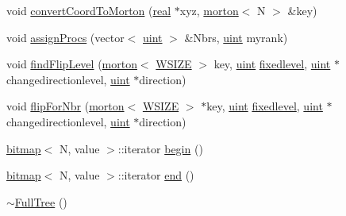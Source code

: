 \begin{DoxyCompactItemize}
\item 
void \mbox{\hyperlink{classFullTree_a1b0a9b6f0f5155dd8847905ee8aa1b56}{convert\+Coord\+To\+Morton}} (\mbox{\hyperlink{definitions_8h_aedc0ad84d1e764530814f57ad931d02a}{real}} $\ast$xyz, \mbox{\hyperlink{definitions_8h_af8682350bd8bb38ee9023f7a0a310add}{morton}}$<$ N $>$ \&key)
\item 
void \mbox{\hyperlink{classFullTree_a71034640d78c83c761cc005a77f83afa}{assign\+Procs}} (vector$<$ \mbox{\hyperlink{definitions_8h_a69aa29b598b851b0640aa225a9e5d61d}{uint}} $>$ \&Nbrs, \mbox{\hyperlink{definitions_8h_a69aa29b598b851b0640aa225a9e5d61d}{uint}} myrank)
\item 
void \mbox{\hyperlink{classFullTree_ae820d50b6b006f8bcdbcbcc5aa2fc9f6}{find\+Flip\+Level}} (\mbox{\hyperlink{definitions_8h_af8682350bd8bb38ee9023f7a0a310add}{morton}}$<$ \mbox{\hyperlink{params_8h_a869e77c8856c40dc7369197ee4ee8059ab8317ae7816b83628f4e2bcff586e2f5}{W\+S\+I\+ZE}} $>$ key, \mbox{\hyperlink{definitions_8h_a69aa29b598b851b0640aa225a9e5d61d}{uint}} \mbox{\hyperlink{classFullTree_a1bcc4d0daf8ad12569054422379b556f}{fixedlevel}}, \mbox{\hyperlink{definitions_8h_a69aa29b598b851b0640aa225a9e5d61d}{uint}} $\ast$changedirectionlevel, \mbox{\hyperlink{definitions_8h_a69aa29b598b851b0640aa225a9e5d61d}{uint}} $\ast$direction)
\item 
void \mbox{\hyperlink{classFullTree_ad3d930eda377be811df22070f6364865}{flip\+For\+Nbr}} (\mbox{\hyperlink{definitions_8h_af8682350bd8bb38ee9023f7a0a310add}{morton}}$<$ \mbox{\hyperlink{params_8h_a869e77c8856c40dc7369197ee4ee8059ab8317ae7816b83628f4e2bcff586e2f5}{W\+S\+I\+ZE}} $>$ $\ast$key, \mbox{\hyperlink{definitions_8h_a69aa29b598b851b0640aa225a9e5d61d}{uint}} \mbox{\hyperlink{classFullTree_a1bcc4d0daf8ad12569054422379b556f}{fixedlevel}}, \mbox{\hyperlink{definitions_8h_a69aa29b598b851b0640aa225a9e5d61d}{uint}} $\ast$changedirectionlevel, \mbox{\hyperlink{definitions_8h_a69aa29b598b851b0640aa225a9e5d61d}{uint}} $\ast$direction)
\item 
\mbox{\hyperlink{definitions_8h_acf2396ef4de9eb8a6324b9f1a624ea85}{bitmap}}$<$ N, value $>$\+::iterator \mbox{\hyperlink{classFullTree_af2fbecbd352a329634a6fdc35f519968}{begin}} ()
\item 
\mbox{\hyperlink{definitions_8h_acf2396ef4de9eb8a6324b9f1a624ea85}{bitmap}}$<$ N, value $>$\+::iterator \mbox{\hyperlink{classFullTree_a692131b057639fecdb1934b734cff1bb}{end}} ()
\item 
\mbox{\hyperlink{classFullTree_a8b2e043f141edee101d55ad0ea497d9f}{$\sim$\+Full\+Tree}} ()
\end{DoxyCompactItemize}
